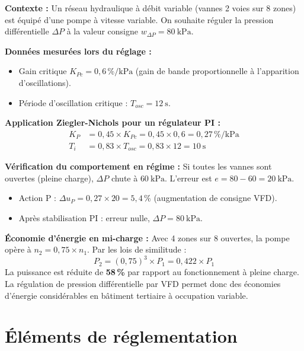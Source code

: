 \begin{exemple}[title={Paramétrage d'un régulateur PI sur boucle de pression différentielle}]
  \textbf{Contexte :} Un réseau hydraulique à débit variable (vannes 2 voies sur 8 zones) est équipé d'une pompe à vitesse variable. On souhaite réguler la pression différentielle $\Delta P$ à la valeur consigne $w_{\Delta P} = \SI{80}{\kilo\pascal}$.

  \textbf{Données mesurées lors du réglage :}
  \begin{itemize}
    \item Gain critique $K_{Pc} = 0{,}6\,\%/\text{kPa}$ (gain de bande proportionnelle à l'apparition d'oscillations).
    \item Période d'oscillation critique : $T_{osc} = \SI{12}{\second}$.
  \end{itemize}

  \textbf{Application Ziegler-Nichols pour un régulateur PI :}
  \begin{align}
    K_P &= 0{,}45 \times K_{Pc} = 0{,}45 \times 0{,}6 = 0{,}27\,\%/\text{kPa}\\
    T_i  &= 0{,}83 \times T_{osc} = 0{,}83 \times 12 = \SI{10}{\second}
  \end{align}

  \textbf{Vérification du comportement en régime :} Si toutes les vannes sont ouvertes (pleine charge), $\Delta P$ chute à $\SI{60}{\kilo\pascal}$. L'erreur est $e = 80 - 60 = \SI{20}{\kilo\pascal}$.
  \begin{itemize}
    \item Action P : $\Delta u_P = 0{,}27 \times 20 = 5{,}4\,\%$ (augmentation de consigne VFD).
    \item Après stabilisation PI : erreur nulle, $\Delta P = \SI{80}{\kilo\pascal}$.
  \end{itemize}

  \textbf{Économie d'énergie en mi-charge :} Avec 4 zones sur 8 ouvertes, la pompe opère à $n_2 = 0{,}75 \times n_1$. Par les lois de similitude :
  \[
    P_2 = (0{,}75)^3 \times P_1 = 0{,}422 \times P_1
  \]
  La puissance est réduite de \textbf{58\,\%} par rapport au fonctionnement à pleine charge. La régulation de pression différentielle par VFD permet donc des économies d'énergie considérables en bâtiment tertiaire à occupation variable.
\end{exemple}

\section{Éléments de réglementation}


